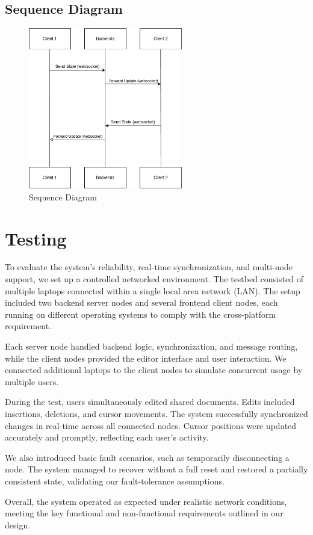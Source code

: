 \documentclass[12pt,a4paper]{article}
\renewcommand\_{\textunderscore\allowbreak}
\begin{document}
\subsection{Sequence Diagram}
\begin{figure}[H]
\caption{Sequence Diagram}
\centering
\includegraphics[width=0.6\textwidth]{seq.drawio}
\end{figure}

\newpage
\section{Testing}

To evaluate the system’s reliability, real-time synchronization, and multi-node support, we set up a controlled networked environment. The testbed consisted of multiple laptops connected within a single local area network (LAN). The setup included two backend server nodes and several frontend client nodes, each running on different operating systems to comply with the cross-platform requirement.

Each server node handled backend logic, synchronization, and message routing, while the client nodes provided the editor interface and user interaction. We connected additional laptops to the client nodes to simulate concurrent usage by multiple users.

During the test, users simultaneously edited shared documents. Edits included insertions, deletions, and cursor movements. The system successfully synchronized changes in real-time across all connected nodes. Cursor positions were updated accurately and promptly, reflecting each user’s activity.

We also introduced basic fault scenarios, such as temporarily disconnecting a node. The system managed to recover without a full reset and restored a partially consistent state, validating our fault-tolerance assumptions.

Overall, the system operated as expected under realistic network conditions, meeting the key functional and non-functional requirements outlined in our design.
\newpage
\nocite{*}%
\printbibliography

\end{document}
